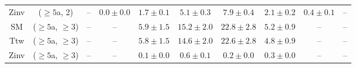 \begin{table}[h!]
{\begin{tabular}{cccccccccc}
	Zinv & ($\ge5$a, 2) & -- & $0.0\pm 0.0$ & $1.7\pm 0.1$ & $5.1\pm 0.3$ & $7.9\pm 0.4$ & $2.1\pm 0.2$ & $0.4\pm 0.1$ & -- \\[0.5ex] 
	SM & ($\ge5$a, $\ge3$) & -- & -- & $5.9\pm 1.5$ & $15.2\pm 2.0$ & $22.8\pm 2.8$ & $5.2\pm 0.9$ & -- & -- \\[0.5ex] 
	Ttw & ($\ge5$a, $\ge3$) & -- & -- & $5.8\pm 1.5$ & $14.6\pm 2.0$ & $22.6\pm 2.8$ & $4.8\pm 0.9$ & -- & -- \\[0.5ex] 
	Zinv & ($\ge5$a, $\ge3$) & -- & -- & $0.1\pm 0.0$ & $0.6\pm 0.1$ & $0.2\pm 0.0$ & $0.3\pm 0.0$ & -- & -- \\[0.5ex] 
	\hline
	\hline
\end{tabular}}
\end{table}

